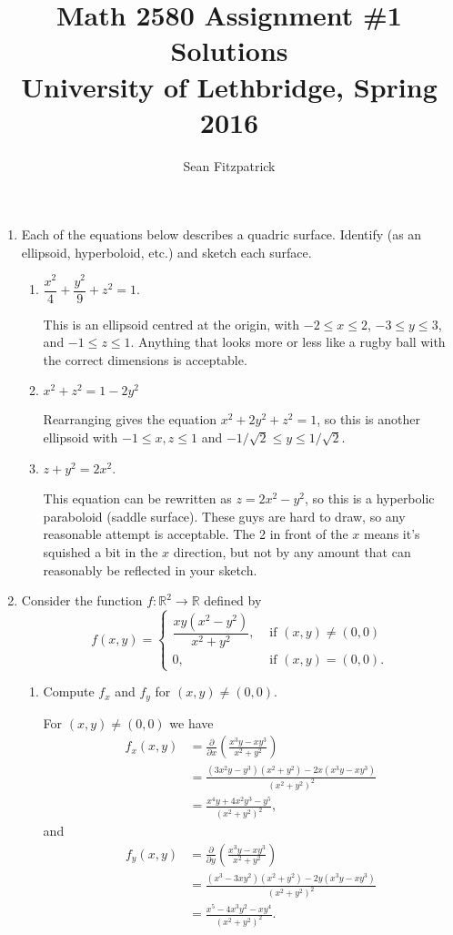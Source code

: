 \documentclass[letterpaper,12pt]{article}
\title{Math 2580 Assignment \#1 Solutions\\University of Lethbridge, Spring 2016}
\author{Sean Fitzpatrick}
\newcommand{\R}{\mathbb{R}}
\begin{document}
 \maketitle


\begin{enumerate}
 \item Each of the equations below describes a quadric surface. Identify (as an ellipsoid, hyperboloid, etc.) and sketch each surface.
\begin{enumerate}
 \item $\dfrac{x^2}{4}+\dfrac{y^2}{9}+z^2=1$.
 
 \bigskip
 
 This is an ellipsoid centred at the origin, with $-2\leq x\leq 2$, $-3\leq y\leq 3$, and $-1\leq z\leq 1$. Anything that looks more or less like a rugby ball with the correct dimensions is acceptable.
 
 \item $x^2+z^2=1-2y^2$

\bigskip
 
 Rearranging gives the equation $x^2+2y^2+z^2=1$, so this is another ellipsoid with $-1\leq x,z\leq 1$ and $-1/\sqrt{2}\leq y\leq 1/\sqrt{2}$.
 
 
 \item $z+y^2=2x^2$.

\bigskip
 
 This equation can be rewritten as $z=2x^2-y^2$, so this is a hyperbolic paraboloid (saddle surface). These guys are hard to draw, so any reasonable attempt is acceptable. The 2 in front of the $x$ means it's squished a bit in the $x$ direction, but not by any amount that can reasonably be reflected in your sketch.
 
\end{enumerate}


\item Consider the function $f:\R^2\to \R$ defined by
\[
 f(x,y) = \begin{cases}
           \dfrac{xy(x^2-y^2)}{x^2+y^2}, & \text{ if } (x,y)\neq (0,0)\\ 0, & \text{ if } (x,y)=(0,0).
          \end{cases}
\]
\begin{enumerate}
 \item Compute $f_x$ and $f_y$ for $(x,y)\neq (0,0)$.
 
 \bigskip
 
 For $(x,y)\neq (0,0)$ we have
 \begin{align*}
 f_x(x,y) & = \frac{\partial}{\partial x}\left(\frac{x^3y-xy^3}{x^2+y^2}\right)\\
 & = \frac{(3x^2y-y^3)(x^2+y^2)-2x(x^3y-xy^3)}{(x^2+y^2)^2}\\
 & = \frac{x^4y+4x^2y^3-y^5}{(x^2+y^2)^2},
 \end{align*}
 and
 \begin{align*}
 f_y(x,y) & =  \frac{\partial}{\partial y}\left(\frac{x^3y-xy^3}{x^2+y^2}\right)\\
 & = \frac{(x^3-3xy^2)(x^2+y^2)-2y(x^3y-xy^3)}{(x^2+y^2)^2}\\
 & = \frac{x^5-4x^3y^2-xy^4}{(x^2+y^2)^2}.
 \end{align*}
 

\end{enumerate}
\end{enumerate}
\end{document}
